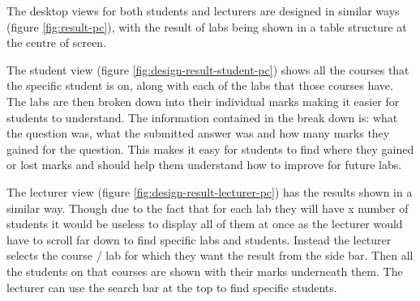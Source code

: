 \documentclass[12pt]{article}  %
\begin{document}
The desktop views for both students and lecturers are designed in similar ways (figure \ref{fig:result-pc}), with the result of labs being shown in a table structure at the centre of screen. 

The student view (figure \ref{fig:design-result-student-pc}) shows all the courses that the specific student is on, along with each of the labs that those courses have. The labs are then broken down into their individual marks making it easier for students to understand. The information contained in the break down is: what the question was, what the submitted answer was and how many marks they gained for the question. This makes it easy for students to find where they gained or lost marks and should help them understand how to improve for future labs.

The lecturer view (figure \ref{fig:design-result-lecturer-pc}) has the results shown in a similar way. Though due to the fact that for each lab they will have x number of students it would be useless to display all of them at once as the lecturer would have to scroll far down to find specific labs and students. Instead the lecturer selects the course / lab for which they want the result from the side bar. Then all the students on that courses are shown with their marks underneath them. The lecturer can use the search bar at the top to find specific students.
\end{document}
